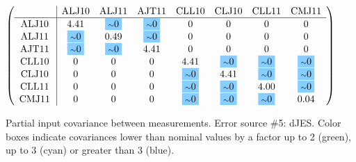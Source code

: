 \begin{table}[H]
\scriptsize
\begin{center}
\renewcommand{\arraystretch}{1.1}
\begin{math}\left(\begin{array}{c|ccccccc}
 & \mathrm{ALJ10} & 
\mathrm{ALJ11} & 
\mathrm{AJT11} & 
\mathrm{CLL10} & 
\mathrm{CLJ10} & 
\mathrm{CLL11} & 
\mathrm{CMJ11} \\
\hline
\mathrm{ALJ10} \hspace*{2pt} &       4.41 &  \colorbox{SkyBlue1}{$ {\scriptstyle \sim }0$} &  \colorbox{SkyBlue1}{$ {\scriptstyle \sim }0$} &  0 &  0 &  0 &  0 \\
\mathrm{ALJ11} \hspace*{2pt} &  \colorbox{SkyBlue1}{$ {\scriptstyle \sim }0$} &       0.49 &  \colorbox{SkyBlue1}{$ {\scriptstyle \sim }0$} &  0 &  0 &  0 &  0 \\
\mathrm{AJT11} \hspace*{2pt} &  \colorbox{SkyBlue1}{$ {\scriptstyle \sim }0$} &  \colorbox{SkyBlue1}{$ {\scriptstyle \sim }0$} &       4.41 &  0 &  0 &  0 &  0 \\
\mathrm{CLL10} \hspace*{2pt} &  0 &  0 &  0 &       4.41 &  \colorbox{SkyBlue1}{$ {\scriptstyle \sim }0$} &  \colorbox{SkyBlue1}{$ {\scriptstyle \sim }0$} &  \colorbox{SkyBlue1}{$ {\scriptstyle \sim }0$} \\
\mathrm{CLJ10} \hspace*{2pt} &  0 &  0 &  0 &  \colorbox{SkyBlue1}{$ {\scriptstyle \sim }0$} &       4.41 &  \colorbox{SkyBlue1}{$ {\scriptstyle \sim }0$} &  \colorbox{SkyBlue1}{$ {\scriptstyle \sim }0$} \\
\mathrm{CLL11} \hspace*{2pt} &  0 &  0 &  0 &  \colorbox{SkyBlue1}{$ {\scriptstyle \sim }0$} &  \colorbox{SkyBlue1}{$ {\scriptstyle \sim }0$} &       4.00 &  \colorbox{SkyBlue1}{$ {\scriptstyle \sim }0$} \\
\mathrm{CMJ11} \hspace*{2pt} &  0 &  0 &  0 &  \colorbox{SkyBlue1}{$ {\scriptstyle \sim }0$} &  \colorbox{SkyBlue1}{$ {\scriptstyle \sim }0$} &  \colorbox{SkyBlue1}{$ {\scriptstyle \sim }0$} &       0.04 \\
\end{array}\right)\end{math}
\caption{Partial input covariance between measurements. Error source \#5: dJES. Color boxes indicate covariances lower than nominal values by a factor up to 2 (green), up to 3 (cyan) or greater than 3 (blue).}
\renewcommand{\arraystretch}{1}
\end{center}
\end{table}
